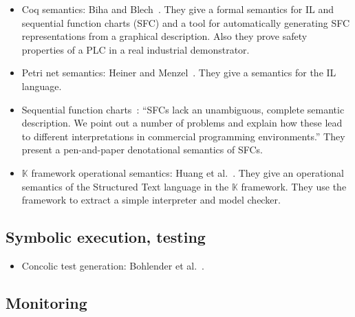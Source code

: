 \begin{itemize}

\item Coq semantics: Biha and Blech~\cite{biha:plc_sem1, biha:plc_sem2,
biha:plc_sem3}. They give a formal semantics for IL and sequential function
charts (SFC) and a tool for automatically generating SFC representations from a
graphical description. Also they prove safety properties of a PLC in a real
industrial demonstrator.


\item Petri net semantics: Heiner and Menzel~\cite{heiner:petri}. They give a
semantics for the IL language.

\item Sequential function charts~\cite{bauer:unifying}: ``SFCs lack an
unambiguous, complete semantic description. We point out a number of problems
and explain how these lead to different interpretations in commercial
programming environments.'' They present a pen-and-paper denotational semantics
of SFCs.


\item $\mathbb{K}$ framework operational semantics: Huang et
al.~\cite{huang:kst}. They give an operational semantics of the Structured Text
language in the $\mathbb{K}$ framework. They use the framework to extract a
simple interpreter and model checker.


\end{itemize}

\subsection{Symbolic execution, testing}

\begin{itemize}

\item Concolic test generation: Bohlender et al.~\cite{bohlender:concolic}.

\end{itemize}

\subsection{Monitoring}

